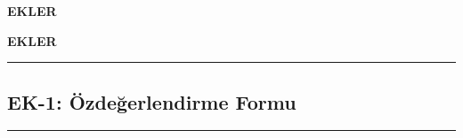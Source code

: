 \documentclass[conference]{IEEEtran}
\begin{document}
\begin{center}
\textbf{\LARGE EKLER}
\end{center}

\vspace{1cm}


\begin{center}
\textbf{\LARGE EKLER}
\end{center}

\vspace{1cm}


\noindent\rule{\textwidth}{1pt}
\subsection*{\Large EK-1: Özdeğerlendirme Formu}
\noindent\rule{\textwidth}{0.5pt}

\vspace{0.5cm}
\end{document}
